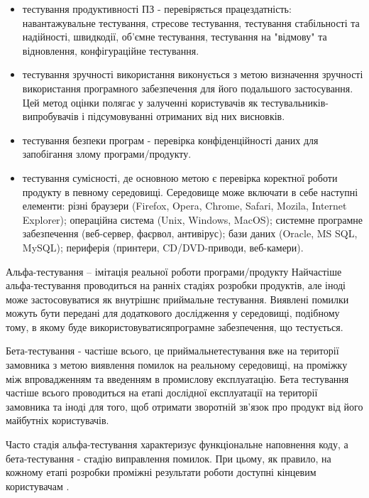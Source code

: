 \begin{itemize}
    \item тестування продуктивності ПЗ - перевіряється працездатність:
      навантажувальне тестування, стресове тестування, тестування
      стабільності та надійності, швидкодії, об'ємне тестування,
      тестування на "відмову" та відновлення, конфігураційне тестування.
    \item тестування зручності використання виконується з метою
      визначення зручності використання програмного забезпечення
      для його подальшого застосування. Цей метод оцінки полягає
      у залученні користувачів як тестувальників-випробувачів і
      підсумовуванні отриманих від них висновків.
    \item тестування безпеки програм - перевірка конфіденційності
      даних для запобігання злому програми/продукту.
    \item тестування сумісності, де основною метою є
      перевірка коректної роботи продукту в певному середовищі.
      Середовище може включати в себе наступні елементи:
      різні браузери (Firefox, Opera, Chrome, Safari, Mozila, Internet Explorer);
      операційна система (Unix, Windows, MacOS); системне програмне
      забезпечення (веб-сервер, фаєрвол, антивірус);
      бази даних (Oracle, MS SQL, MySQL); периферія (принтери, CD/DVD-приводи, веб-камери).
\end{itemize}

Альфа-тестування – імітація реальної роботи програми/продукту
Найчастіше альфа-тестування проводиться на ранніх стадіях
розробки продуктів, але іноді може застосовуватися як внутрішнє
приймальне тестування. Виявлені помилки можуть бути
передані для додаткового дослідження у середовищі, подібному
тому, в якому буде використовуватисяпрограмне забезпечення, що тестується.

Бета-тестування - частіше всього, це приймальнетестування
вже на території замовника з метою виявлення помилок
на реальному середовищі, на проміжку між впровадженням
та введенням в промислову експлуатацію. Бета тестування
частіше всього проводиться на етапі дослідної експлуатації
на території замовника та іноді для того, щоб отримати
зворотній зв'язок про продукт від його майбутніх користувачів.

Часто стадія альфа-тестування характеризує функціональне
наповнення коду, а бета-тестування - стадію виправлення помилок.
При цьому, як правило, на кожному етапі розробки проміжні
результати роботи доступні кінцевим користувачам 
\cite{testing-black,iso-software-eng}.

